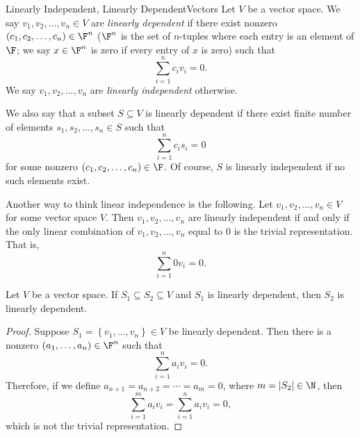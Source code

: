 \documentclass[linearalgebra]{subfiles}
\begin{document}
    \begin{definition}{Linearly Independent, Linearly Dependent}{Vectors}
        Let $V$ be a vector space. We say $v_1,v_2,\ldots,v_n\in V$ are \emph{linearly dependent} if there exist nonzero $\left( c_1,c_2,\ldots,c_n \right)\in\F^n$ ($\F^n$ is the set of $n$-tuples where each entry is an element of $\F$; we say $x\in\F^n$ is zero if every entry of $x$ is zero) such that
        \begin{equation*}
            \sum^{n}_{i=1} c_iv_i = 0.
        \end{equation*}
        We say $v_1,v_2,\ldots,v_n$ are \emph{linearly independent} otherwise.
    \end{definition}

    \begin{remark}
        We also say that a subset $S\subseteq V$ is linearly dependent if there exist finite number of elements $s_1,s_2,\ldots,s_n\in S$ such that
        \begin{equation*}
            \sum^{n}_{i=1} c_is_i = 0
        \end{equation*}
        for some nonzero $\left( c_1,c_2,\ldots,c_n \right) \in\F$. Of course, $S$ is linearly independent if no such elements exist.
    \end{remark}

    \begin{remark}
        Another way to think linear independence is the following. Let $v_1,v_2,\ldots,v_n\in V$ for some vector space $V$. Then $v_1,v_2,\ldots,v_n$ are linearly independent if and only if the only linear combination of $v_1,v_2,\ldots,v_n$ equal to 0 is the trivial representation. That is,
        \begin{equation*}
            \sum^{n}_{i=1} 0v_i = 0.
        \end{equation*}
    \end{remark}

    \clearpage
    \begin{prop}{}
        Let $V$ be a vector space. If $S_1\subseteq S_2\subseteq V$ and $S_1$ is linearly dependent, then $S_2$ is linearly dependent.
    \end{prop}

    \begin{proof}
        Suppose $S_1 = \left\lbrace v_1, \ldots, v_n \right\rbrace \in V$ be linearly dependent. Then there is a nonzero $(a_1, \ldots, a_n)\in \F^n$ such that
        \begin{equation*}
            \sum^n_{i=1} a_iv_i = 0.
        \end{equation*}
        Therefore, if we define $a_{n+1}=a_{n+2}=\cdots=a_m=0$, where $m=\left| S_2 \right|\in\N$, then
        \begin{equation*}
            \sum^{m}_{i=1} a_iv_i = \sum^{n}_{i=1} a_iv_i = 0,
        \end{equation*}
        which is not the trivial representation.
    \end{proof}
\end{document}
